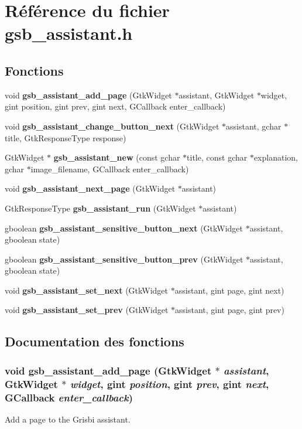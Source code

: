 \section{Référence du fichier gsb\_\-assistant.h}
\label{gsb__assistant_8h}
\subsection*{Fonctions}
\begin{DoxyCompactItemize}
\item 
void {\bf gsb\_\-assistant\_\-add\_\-page} (GtkWidget $\ast$assistant, GtkWidget $\ast$widget, gint position, gint prev, gint next, GCallback enter\_\-callback)
\item 
void {\bf gsb\_\-assistant\_\-change\_\-button\_\-next} (GtkWidget $\ast$assistant, gchar $\ast$title, GtkResponseType response)
\item 
GtkWidget $\ast$ {\bf gsb\_\-assistant\_\-new} (const gchar $\ast$title, const gchar $\ast$explanation, gchar $\ast$image\_\-filename, GCallback enter\_\-callback)
\item 
void {\bf gsb\_\-assistant\_\-next\_\-page} (GtkWidget $\ast$assistant)
\item 
GtkResponseType {\bf gsb\_\-assistant\_\-run} (GtkWidget $\ast$assistant)
\item 
gboolean {\bf gsb\_\-assistant\_\-sensitive\_\-button\_\-next} (GtkWidget $\ast$assistant, gboolean state)
\item 
gboolean {\bf gsb\_\-assistant\_\-sensitive\_\-button\_\-prev} (GtkWidget $\ast$assistant, gboolean state)
\item 
void {\bf gsb\_\-assistant\_\-set\_\-next} (GtkWidget $\ast$assistant, gint page, gint next)
\item 
void {\bf gsb\_\-assistant\_\-set\_\-prev} (GtkWidget $\ast$assistant, gint page, gint prev)
\end{DoxyCompactItemize}


\subsection{Documentation des fonctions}
\subsubsection[{gsb\_\-assistant\_\-add\_\-page}]{\setlength{\rightskip}{0pt plus 5cm}void gsb\_\-assistant\_\-add\_\-page (GtkWidget $\ast$ {\em assistant}, \/  GtkWidget $\ast$ {\em widget}, \/  gint {\em position}, \/  gint {\em prev}, \/  gint {\em next}, \/  GCallback {\em enter\_\-callback})}\label{gsb__assistant_8h_a6972bde2415e07b7afb35a062456f129}
Add a page to the Grisbi assistant.


